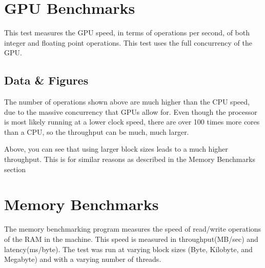 \documentclass{article}
\begin{document}
\section{GPU Benchmarks}
This test measures the GPU speed, in terms of operations per second, of both integer and floating point operations.  This test uses the full concurrency of the GPU.

\subsection{Data \& Figures}
\begin{figure}[H]
\end{figure}
The number of operations shown above are much higher than the CPU speed, due to the massive concurrency that GPUs allow for.  Even though the processor is most likely running at a lower clock speed, there are over 100 times more cores than a CPU, so the throughput can be much, much larger. \\

\begin{figure}[H]
\end{figure}

Above, you can see that using larger block sizes leads to a much higher throughput.  This is for similar reasons as described in the Memory Benchmarks section

\section{Memory Benchmarks}
The memory benchmarking program measures the speed of read/write operations of the RAM in the machine.  This speed is measured in throughput(MB/sec) and latency(ms/byte).  The test was run at varying block sizes (Byte, Kilobyte, and Megabyte) and with a varying number of threads.
\end{document}
